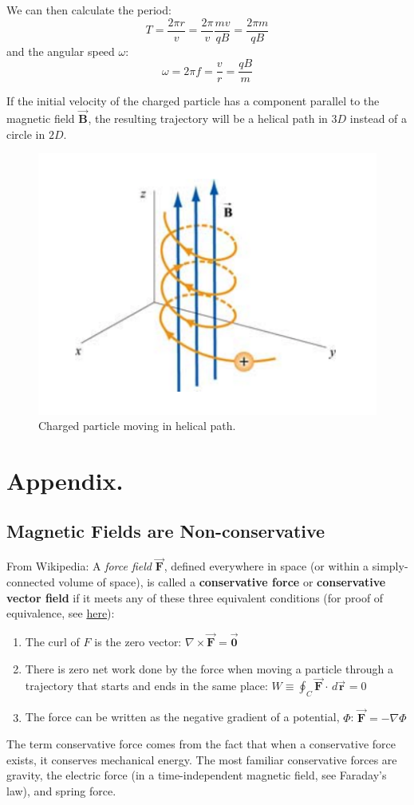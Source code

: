 \documentclass[11pt, letterpaper]{article}
\theoremstyle{definition}
\theoremstyle{remark}
\newcommand{\bv}[2][]{\bm{\vec{#2}_{#1}}}
\begin{document}
We can then calculate the period: \[T = \frac{2\pi r}{v} = \frac{2\pi}{v}\frac{mv}{qB} = \frac{2\pi m}{qB}\] and the angular speed $\omega$: \[\boxed{\omega = 2\pi f = \frac{v}{r} = \frac{qB}{m}}\]

If the initial velocity of the charged particle has a component parallel to the magnetic field $\bv{B}$, the resulting trajectory will be a helical path in $3D$ instead of a circle in $2D$.
\begin{figure}[h!]
	\centering
	\includegraphics[scale=0.5]{helix}
	\caption{Charged particle moving in helical path.}
	\label{fig:helix}
\end{figure}


\section{Appendix.}
\subsection{Magnetic Fields are Non-conservative}
\label{subsec:non-conservative}
From Wikipedia: A \textit{force field} $\bv{F}$, defined everywhere in space (or within a simply-connected volume of space), is called a \textbf{conservative force} or \textbf{conservative vector field} if it meets any of these three equivalent conditions (for proof of equivalence, see \href{https://en.wikipedia.org/wiki/Conservative_force#Mathematical_description}{here}):
\begin{enumerate}
	\item The curl of $F$ is the zero vector: $\nabla\times\bv{F} = \bv{0}$
	\item There is zero net work done by the force when moving a particle through a trajectory that starts and ends in the same place: $W \equiv \oint_C \bv{F}\cdot\, d\bv{r} = 0$
	\item The force can be written as the negative gradient of a potential, $\Phi$: $\bv{F} = -\nabla\Phi$
\end{enumerate}
The term conservative force comes from the fact that when a conservative force exists, it conserves mechanical energy. The most familiar conservative forces are gravity, the electric force (in a time-independent magnetic field, see Faraday's law), and spring force.
\end{document}
